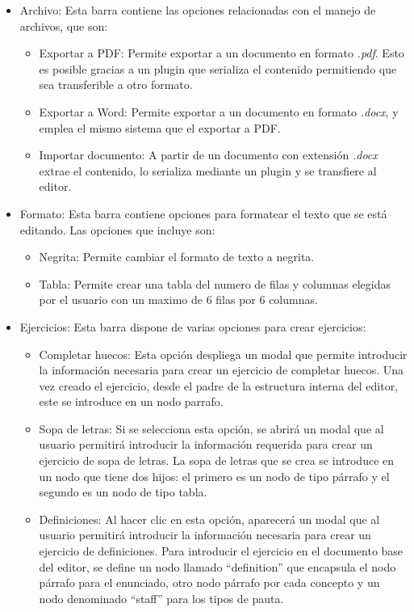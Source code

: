 \begin{itemize}
  \item Archivo: Esta barra contiene las opciones relacionadas con el manejo de archivos, que son:
        \begin{itemize}
          \item  Exportar a PDF: Permite exportar a un documento en formato \textit{.pdf}. Esto es posible gracias a un plugin que serializa el contenido permitiendo que sea transferible a otro formato.
          \item  Exportar a Word: Permite exportar a un documento en formato \textit{.docx}, y emplea el mismo sistema que el exportar a PDF.
          \item Importar documento: A partir de un documento con extensión \textit{.docx} extrae el contenido, lo serializa mediante un plugin y se transfiere al editor.
        \end{itemize}
  \item Formato: Esta barra contiene opciones para formatear el texto que se está editando. Las opciones que incluye son:
        \begin{itemize}
          \item Negrita: Permite cambiar el formato de texto a negrita.
          \item Tabla: Permite crear una tabla del numero de filas y columnas elegidas por el usuario con un maximo de 6 filas por 6 columnas.
        \end{itemize}
  \item Ejercicios: Esta barra dispone de varias opciones para crear ejercicios:
        \begin{itemize}
          \item Completar huecos: Esta opción despliega un modal que permite introducir la información necesaria para crear un ejercicio de completar huecos. Una vez creado el ejercicio, desde el padre de la estructura interna del editor, este se introduce en un nodo parrafo.
          \item Sopa de letras: Si se selecciona esta opción, se abrirá un modal que al usuario permitirá introducir la información requerida para crear un ejercicio de sopa de letras. La sopa de letras que se crea se introduce en un nodo que tiene dos hijos: el primero es un nodo de tipo párrafo y el segundo es un nodo de tipo tabla.
          \item Definiciones: Al hacer clic en esta opción, aparecerá un modal que al usuario permitirá introducir la información necesaria para crear un ejercicio de definiciones. Para introducir el ejercicio en el documento base del editor, se define un nodo llamado ``definition'' que encapsula el nodo párrafo para el enunciado, otro nodo párrafo por cada concepto y un nodo denominado ``staff'' para los tipos de pauta.

\end{itemize}
\end{itemize}
